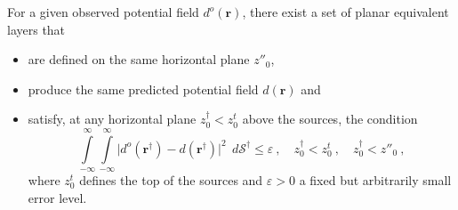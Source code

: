 \begin{theorem}
	\label{theorem:planar-eqlayer-theorem}
	For a given observed potential field $d^{o}(\mathbf{r})$, 
	there exist a set of planar equivalent layers that 
	\begin{itemize}
		\item[(a)] are defined on the same horizontal plane $z''_{0}$, 
		\item[(b)] produce the same predicted potential field $d(\mathbf{r})$ and 
		\item[(c)] satisfy, at any horizontal plane $z^{\dagger}_{0} < z^{t}_{0}$ above the sources, the condition
		\begin{equation}
			\int\limits_{-\infty}^{\infty} \int\limits_{-\infty}^{\infty}
			\vert d^{o}(\mathbf{r}^{\dagger}) - 
			d(\mathbf{r}^{\dagger}) \vert^{2}
			\:\: d\mathcal{S}^{\dagger} \le \varepsilon \: ,
			\quad z^{\dagger}_{0} < z^{t}_{0} \: , \quad z^{\dagger}_{0} < z''_{0} \: ,
			\label{eq:epsilon-bound-data}
		\end{equation}
		where $z^{t}_{0}$ defines the top of the sources and $\varepsilon > 0$ a 
		fixed but arbitrarily small error level.
	\end{itemize}
\end{theorem}
